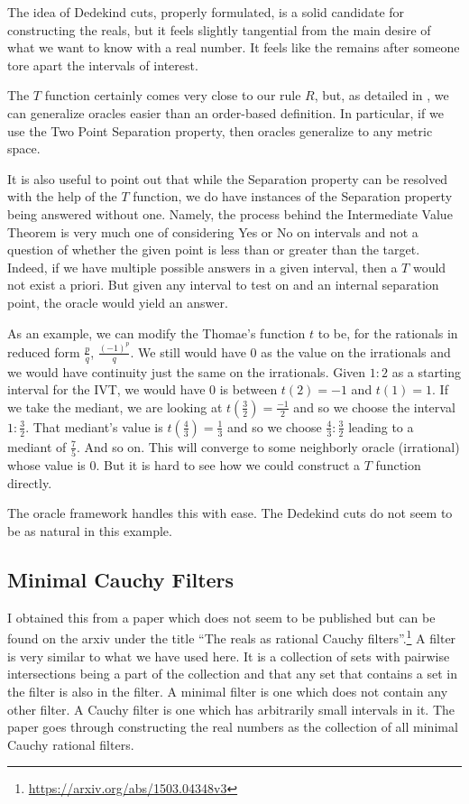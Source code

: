 \documentclass[12pt]{article}
\begin{document}
The idea of Dedekind cuts, properly formulated, is a solid candidate for constructing the reals, but it feels slightly tangential from the main desire of what we want to know with a real number. It feels like the remains after someone tore apart the intervals of interest. 

The $T$ function certainly comes very close to our rule $R$, but, as detailed in \cite{taylor23metric}, we can generalize oracles easier than an order-based definition. In particular, if we use the Two Point Separation property, then oracles generalize to any metric space. 

It is also useful to point out that while the Separation property can be resolved with the help of the $T$ function, we do have instances of the Separation property being answered without one. Namely, the process behind the Intermediate Value Theorem is very much one of considering Yes or No on intervals and not a question of whether the given point is less than or greater than the target. Indeed, if we have multiple possible answers in a given interval, then a $T$ would not exist a priori. But given any interval to test on and an internal separation point, the oracle would yield an answer. 

As an example, we can modify the Thomae's function $t$ to be, for the rationals in reduced form $\frac{p}{q}$, $\frac{(-1)^p}{q}$. We still would have $0$ as the value on the irrationals and we would have continuity just the same on the irrationals. Given $1:2$ as a starting interval for the IVT, we would have $0$ is between $t(2) = -1$ and $t(1) = 1$. If we take the mediant, we are looking at $t(\frac{3}{2}) = \frac{-1}{2}$ and so we choose the interval $1:\frac{3}{2}$. That mediant's value is $t(\frac{4}{3}) = \frac{1}{3}$ and so we choose $\frac{4}{3}:\frac{3}{2}$ leading to a mediant of $\frac{7}{5}$. And so on. This will converge to some neighborly oracle (irrational) whose value is $0$. But it is hard to see how we could construct a $T$ function directly.

The oracle framework handles this with ease. The Dedekind cuts do not seem to be as natural in this example. 

\subsection{Minimal Cauchy Filters}

I obtained this from a paper which does not seem to be published but can be found on the arxiv under the title ``The reals as rational Cauchy filters''.\footnote{\url{https://arxiv.org/abs/1503.04348v3}} A filter is very similar to what we have used here. It is a collection of sets with pairwise intersections being a part of the collection and that any set that contains a set in the filter is also in the filter. A minimal filter is one which does not contain any other filter. A Cauchy filter is one which has arbitrarily small intervals in it. The paper goes through constructing the real numbers as the collection of all minimal Cauchy rational filters. 
\end{document}
